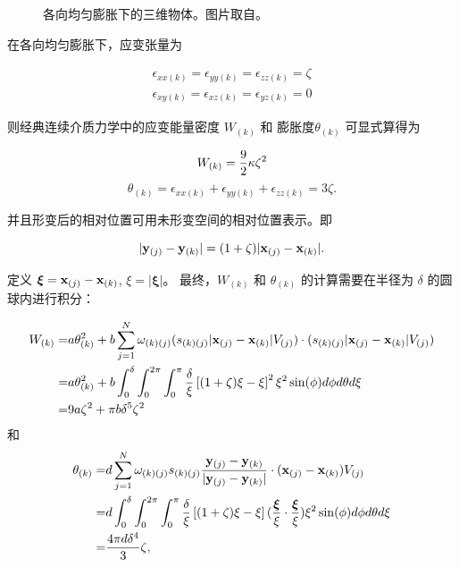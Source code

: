 {{{\begin{figure}[htbp!]
  \caption{\label{pdm_isotropic_expansion}
           各向均匀膨胀下的三维物体。图片取自。
          }
\end{figure}

在各向均匀膨胀下，应变张量为

\begin{eqnarray}
  \epsilon_{xx(k)} =  \epsilon_{yy(k)} = \epsilon_{zz(k)} = \zeta\\
  \epsilon_{xy(k)} =  \epsilon_{xz(k)} = \epsilon_{yz(k)} = 0
\end{eqnarray}

则经典连续介质力学中的应变能量密度 $W_{(k)}$ 和 膨胀度$\theta_{(k)}$ 可显式算得为

\begin{equation}
W_{(k)} = \frac{9}{2}\kappa\zeta^2\\
\label{eq:33}
\end{equation}
\begin{equation}
\theta_{(k)} = \epsilon_{xx(k)}+\epsilon_{yy(k)}+\epsilon_{zz(k)} = 3\zeta.
\label{eq:34}
\end{equation}

并且形变后的相对位置可用未形变空间的相对位置表示。即

\begin{equation}
|\mathbf{y}_{(j)} - \mathbf{y}_{(k)}| = (1+\zeta)|\mathbf{x}_{(j)} - \mathbf{x}_{(k)}|.
\label{eq:35}
\end{equation}

定义 $\bm{\xi} = \mathbf{x}_{(j)} - \mathbf{x}_{(k)}$, $\xi = |\bm{\xi}|$。
最终，$W_{(k)}$ 和 $\theta_{(k)}$ 的计算需要在半径为 $\delta$ 的圆球内进行积分：

\begin{equation}
\begin{aligned}
W_{(k)} =& a\theta_{(k)}^2
           +b\sum_{j=1}^{N}\omega_{(k)(j)}(s_{(k)(j)}|\mathbf{x}_{(j)}-\mathbf{x}_{(k)}|V_{(j)})\cdot(s_{(k)(j)}|\mathbf{x}_{(j)}-\mathbf{x}_{(k)}|V_{(j)})\\
        =& a\theta_{(k)}^2
           +b\int_0^\delta\int_0^{2\pi}\int_0^{\pi}\frac{\delta}{\xi}\left[(1+\zeta)\xi-\xi\right]^2\xi^2\sin(\phi)d\phi d\theta d\xi\\
        =& 9a\zeta^2+\pi b\delta^5\zeta^2
\end{aligned}
\label{eq:36}
\end{equation}
和
\begin{equation}
\begin{aligned}
\theta_{(k)} =& d\sum_{j=1}^{N}\omega_{(k)(j)}s_{(k)(j)}\frac{\mathbf{y}_{(j)} - \mathbf{y}_{(k)}}{|\mathbf{y}_{(j)} - \mathbf{y}_{(k)}|}\cdot(\mathbf{x}_{(j)}-\mathbf{x}_{(k)})V_{(j)}\\
        =& d\int_0^\delta\int_0^{2\pi}\int_0^{\pi}\frac{\delta}{\xi}\left[(1+\zeta)\xi-\xi\right](\frac{\bm{\xi}}{\xi}\cdot\frac{\bm{\xi}}{\xi})\xi^2\sin(\phi)d\phi d\theta d\xi\\
        =& \frac{4\pi d\delta^4}{3}\zeta,
\end{aligned}
\label{eq:37}
\end{equation}

}}}
